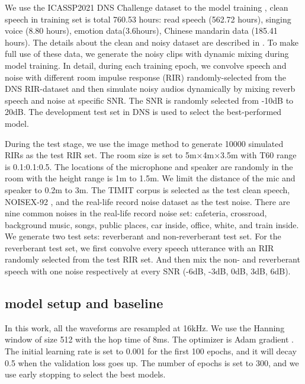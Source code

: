 \documentclass[journal,10pt]{IEEEtran}
\begin{document}
We use the ICASSP2021 DNS Challenge dataset to the model training \cite{reddy2020icassp}, clean speech in training set is total 760.53 hours: read speech (562.72 hours), singing voice (8.80 hours), emotion data(3.6hours), Chinese mandarin data (185.41 hours). The details about the clean and noisy dataset are described in \cite{reddy2020interspeechresults}. To make full use of these data,  we generate the noisy clips with dynamic mixing during model training. In detail, during each training epoch, we convolve speech and noise with different room impulse response (RIR) randomly-selected from the DNS RIR-dataset and then simulate noisy audios dynamically by mixing reverb speech and noise at specific SNR. The SNR is randomly selected from -10dB to 20dB. The development test set in DNS is used to select the best-performed model.

During the test stage, we use the image method \cite{allen1979image} to generate 10000 simulated RIRs as the test RIR set. The room size is set to 5m×4m×3.5m with T60 range is 0.1:0.1:0.5. The locations of the microphone and speaker are randomly in the room with the height range is 1m to 1.5m. We limit the distance of the mic and speaker to 0.2m to 3m. The TIMIT corpus \cite{garofolo1993darpa} is selected as the test clean speech, NOISEX-92 \cite{varga1993assessment}, and the real-life record noise dataset as the test noise. There are nine common noises in the real-life record noise set: cafeteria, crossroad, background music, songs, public places, car inside, office, white, and train inside. We generate two test sets: reverberant and non-reverberant test set. For the reverberant test set, we first convolve every speech utterance with an RIR randomly selected from the test RIR set. And then mix the non- and reverberant speech with one noise respectively at every SNR (-6dB, -3dB, 0dB, 3dB, 6dB).

\subsection{model setup and baseline}

In this work, all the waveforms are resampled at 16kHz. We use the Hanning window of size 512 with the hop time of 8ms. The optimizer is Adam gradient \cite{kingma2014adam}. The initial learning rate is set to 0.001 for the first 100 epochs, and it will decay 0.5 when the validation loss goes up. The number of epochs is set to 300, and we use early stopping to select the best models.
\end{document}
